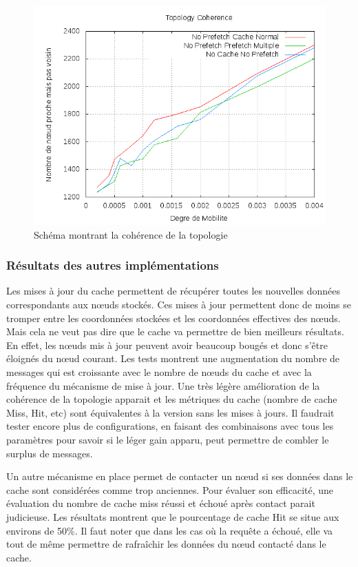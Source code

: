 	\begin{figure}[!h]
        \centering
        \includegraphics[scale=0.5]{../CacheCode/SolipsisPeersim/resultats/Courbes/Courbes_Final_Rapport/Topology_Coherence_Caches.png}
        \caption{Schéma montrant la cohérence de la topologie}
        \label{courbesTopoCohCache:config1}
        \end{figure}

\subsubsection{Résultats des autres implémentations}

Les mises à jour du cache permettent de récupérer toutes les nouvelles données correspondants aux nœuds stockés. Ces mises à jour permettent donc de moins se tromper entre les coordonnées stockées et les coordonnées effectives des nœuds. Mais cela ne veut pas dire que le cache va permettre de bien meilleurs résultats. En effet, les nœuds mis à jour peuvent avoir beaucoup bougés et donc s'être éloignés du nœud courant. Les tests montrent une augmentation du nombre de messages qui est croissante avec le nombre de nœuds du cache et avec la fréquence du mécanisme de mise à jour. Une très légère amélioration de la cohérence de la topologie apparait et les métriques du cache (nombre de cache Miss, Hit, etc) sont équivalentes à la version sans les mises à jours. Il faudrait tester encore plus de configurations, en faisant des combinaisons avec tous les paramètres pour savoir si le léger gain apparu, peut permettre de combler le surplus de messages.
\par Un autre mécanisme en place permet de contacter un nœud si ses données dans le cache sont considérées comme trop anciennes. Pour évaluer son efficacité, une évaluation du nombre de cache miss réussi et échoué après contact parait judicieuse. Les résultats montrent que le pourcentage de cache Hit se situe aux environs de 50\%. Il faut noter que dans les cas où la requête a échoué, elle va tout de même permettre de rafraîchir les données du nœud contacté dans le cache.


